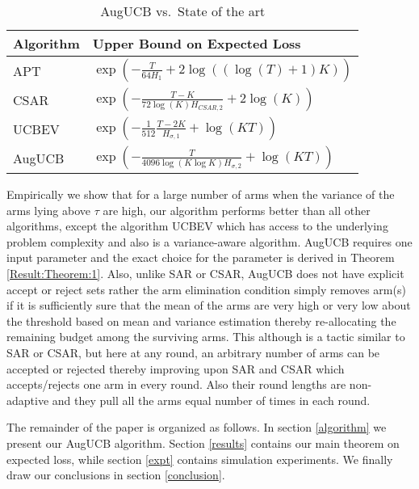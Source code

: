 \begin{table}[b]
\caption{AugUCB vs.\ State of the art}
\label{tab:regret-bds}
\begin{center}
\begin{tabular}{|p{1.3cm}|p{6.4cm}|}
\hline
Algorithm  & Upper Bound on Expected Loss \\
\hline
\hline
APT         &$\exp\left(-\frac{T}{64 H_1}+2\log((\log(T)+1)K)\right)$ \\
\hline
\hline
CSAR		&$\exp\left(-\frac{T-K}{72\log(K)H_{CSAR,2}}+2\log(K)\right)$ \\
\hline
\hline
UCBEV		&$\exp\left(-\frac{1}{512}\frac{T-2K}{H_{\sigma,1}} + \log\left(KT\right)\right)$ \\
\hline
\hline
AugUCB      &$ \exp\left(- \frac{T}{4096 \log(K\log K)H_{\sigma,2}} + \log\left(KT\right) \right) $ \\
\hline
\end{tabular}
\end{center}
\end{table}
Empirically we show that for a large number of arms when the variance of the arms lying above $\tau$ are high, our algorithm performs better than all other algorithms, except the algorithm UCBEV which has access to the underlying problem complexity and also is a variance-aware algorithm. AugUCB requires one input parameter and the exact choice for the parameter is derived in Theorem \ref{Result:Theorem:1}. Also, unlike SAR or CSAR, AugUCB does not have explicit accept or reject sets rather the arm elimination condition simply removes arm(s) if it is sufficiently sure that the mean of the arms are very high or very low about the threshold based on mean and variance estimation thereby re-allocating the remaining budget among the surviving arms. This although is a tactic similar to SAR or CSAR, but here at any round, an arbitrary number of arms can be accepted or rejected thereby improving upon SAR and CSAR which accepts/rejects one arm in every round. Also their round lengths are non-adaptive and they pull all the arms equal number of times in each round. 

The remainder of the paper is organized as follows. In section \ref{algorithm} we present our AugUCB algorithm. 
Section \ref{results} contains our main theorem on expected loss, while section \ref{expt} contains simulation experiments. We finally draw our conclusions in section \ref{conclusion}.

